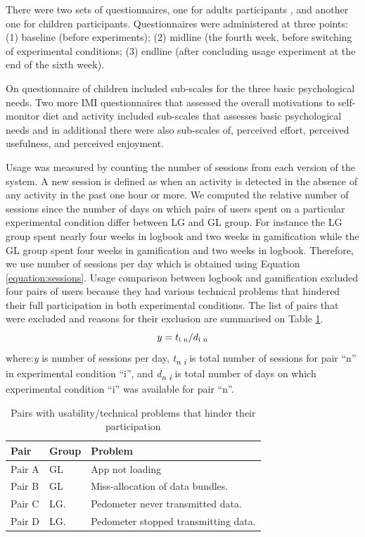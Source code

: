 \documentclass{sig-alternate}
\def\SB#1{\textsubscript{\textcolor{black}{#1}}}
\begin{document}
There were two sets of questionnaires, one for adults participants , and another one for children participants. Questionnaires were administered at three points: (1) baseline (before experiments); (2) midline (the fourth week, before switching of experimental conditions; (3) endline (after concluding usage experiment at the end of the sixth week).

On questionnaire of children included sub-scales for the three basic psychological needs. Two more IMI questionnaires that assessed the overall motivations to self-monitor diet and activity included sub-scales that assesses basic psychological needs and in additional there were also sub-scales of, perceived effort, perceived usefulness, and perceived enjoyment.

Usage was measured by counting the number of sessions from each version of the system. A new session is defined as when an activity is detected in the absence of any activity in the past one hour or more. We computed the relative number of sessions since the number of days on which pairs of users spent on a particular experimental condition differ between LG and GL group. For instance the LG group spent nearly four weeks in logbook and two weeks in gamification while the GL group spent four weeks in gamification and two weeks in logbook. Therefore, we use number of sessions per day which is obtained using Equation \ref{equation:sessions}. Usage comparison between logbook and gamification excluded four pairs of users because they had various technical problems that hindered their full participation in both experimental conditions. The list of pairs that were excluded and reasons for their exclusion are summarised on Table \ref{table:usageproblems}.
\begin{equation}
\label{equation:sessions}
y=t\SB{i n}/d\SB{i n}
\end{equation}
where:\emph{y} is number of sessions per day, \emph{t\SB{n i}} is total number of sessions for pair ``n'' in experimental condition ``i'', and \emph{d\SB{n i}} is total number of days on which experimental condition ``i'' was available for pair ``n''.
\begin{table}[h!]
  \begin{center}
    \caption{Pairs with usability/technical problems that hinder their participation}
    \label{table:usageproblems}
	\begin{tabular}{|p{1cm}|p{0.8cm}|p{5cm}|}
		\hline
		Pair&Group&Problem\\
		\hline
		Pair A&GL &App not loading\\
		\hline
		Pair B&GL& Miss-allocation of data bundles.\\
		\hline
		Pair C & LG.& Pedometer never transmitted data.\\
		\hline
		Pair D & LG.& Pedometer stopped transmitting data.\\
	\hline
	\end{tabular}
  \end{center}
\end{table}
\end{document}
